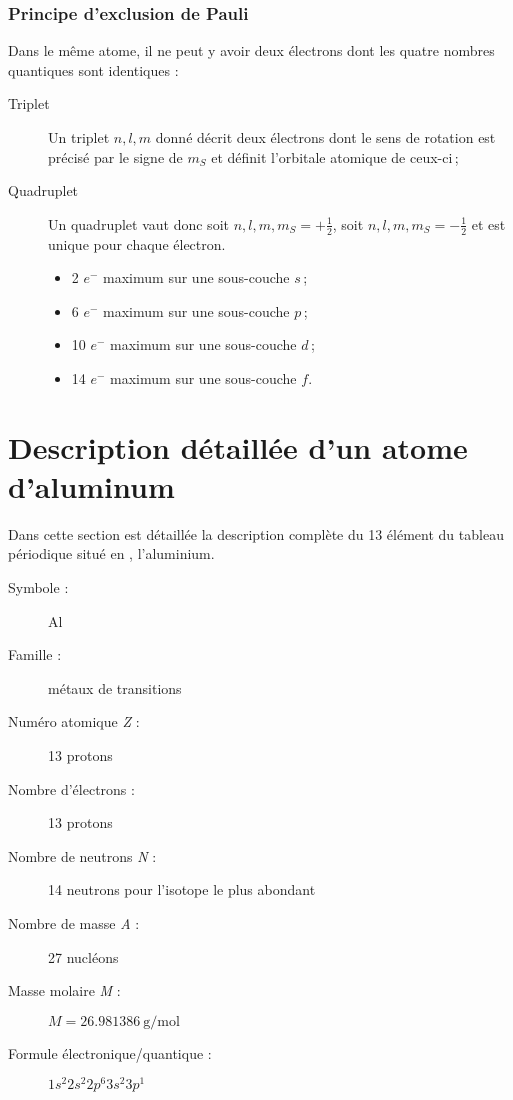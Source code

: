 \subsubsection{Principe d'exclusion de Pauli}

 Dans le même atome, il ne peut y avoir deux électrons dont les quatre nombres quantiques sont identiques : \begin{description}
	\item[Triplet] Un triplet $n, l, m$ donné décrit deux électrons dont le sens de rotation est précisé par le signe de $m_S$ et définit l'orbitale atomique de ceux-ci\,;
	\item[Quadruplet]  Un quadruplet vaut donc soit $n, l, m, m_S=+\frac{1}{2}$, soit $n, l, m, m_S=-\frac{1}{2}$ et est unique pour chaque électron.
	\begin{itemize}
		\item 2 $e^-$ maximum sur une sous-couche $s$\,;
		\item 6 $e^-$ maximum sur une sous-couche $p$\,;
		\item 10 $e^-$ maximum sur une sous-couche $d$\,;
		\item 14 $e^-$ maximum sur une sous-couche $f$.
	\end{itemize}
\end{description}
 
\section{Description détaillée d'un atome d'aluminum}
 
Dans cette section est détaillée la description complète du 13 élément du tableau périodique situé en  , l'aluminium.


 
\begin{description}
	\item[Symbole :] Al
	\item[Famille :] métaux de transitions
	\item[Numéro atomique \emph{Z} :] 13 protons
	\item[Nombre d'électrons :] 13 protons
	\item[Nombre de neutrons \emph{N} :] 14 neutrons pour l'isotope le plus abondant
	\item[Nombre de masse \emph{A} :] 27 nucléons
	\item[Masse molaire \emph{M} :] $M=\SI{26.981386}{\gram\per\mole}$ %
	\item[Formule électronique/quantique :] $1s^{2}2s^{2}2p^{6}3s^{2}3p^{1}$ %
\end{description}


